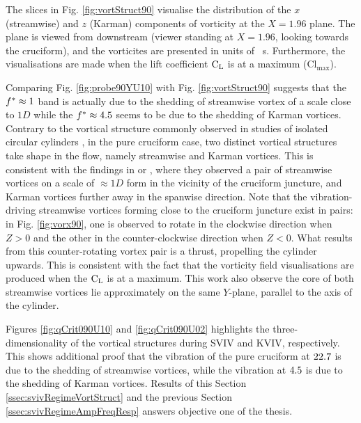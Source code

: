 \documentclass[oneside]{utmthesis}
\begin{document}
The slices in Fig. \ref{fig:vortStruct90} visualise the distribution of the $x$ (streamwise) and $z$ (Karman) components of vorticity at the $X = 1.96$ plane. The plane is viewed from downstream (viewer standing at $X = 1.96$, looking towards the cruciform), and the vorticites are presented in units of \si{\per\second}. Furthermore, the visualisations are made when the lift coefficient $\text{C}_{\text{L}}$ is at a maximum ($\text{Cl}_{\text{max}}$).

Comparing Fig. \ref{fig:probe90YU10} with Fig. \ref{fig:vortStruct90} suggests that the $f^{*} \approx 1$ band is actually due to the shedding of streamwise vortex of a scale close to $1D$ while the $f^{*} \approx 4.5$ seems to be due to the shedding of Karman vortices. Contrary to the vortical structure commonly observed in studies of isolated circular cylinders \citep{Deng2007,Kinaci2016,Duranay2020}, in the pure cruciform case, two distinct vortical structures take shape in the flow, namely streamwise and Karman vortices. This is consistent with the findings in \citet{Koide2017} or \citet{Zhao2018a}, where they observed a pair of streamwise vortices on a scale of $\approx 1D$ form in the vicinity of the cruciform juncture, and Karman vortices further away in the spanwise direction. Note that the vibration-driving streamwise vortices forming close to the cruciform juncture exist in pairs: in Fig. \ref{fig:vorx90}, one is observed to rotate in the clockwise direction when $Z > 0$ and the other in the counter-clockwise direction when $Z < 0$. What results from this counter-rotating vortex pair is a thrust, propelling the cylinder upwards. This is consistent with the fact that the vorticity field visualisations are produced when the $\text{C}_{\text{L}}$ is at a maximum. This work also observe the core of both streamwise vortices lie approximately on the same $Y$-plane, parallel to the axis of the cylinder.

Figures \ref{fig:qCrit090U10} and \ref{fig:qCrit090U02} highlights the three-dimensionality of the vortical structures during SVIV and KVIV, respectively. This shows additional proof that the vibration of the pure cruciform at $22.7$ is due to the shedding of streamwise vortices, while the vibration at $4.5$ is due to the shedding of Karman vortices. Results of this Section \ref{ssec:svivRegimeVortStruct} and the previous Section \ref{ssec:svivRegimeAmpFreqResp} answers objective one of the thesis.
\end{document}
